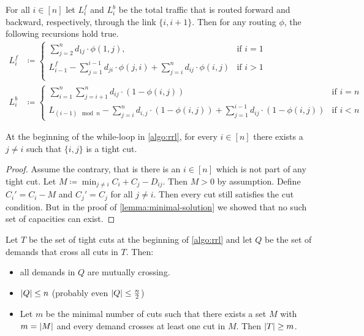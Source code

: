 \begin{lemma}
	For all $i \in [n]$ let $L_i^f$ and $L_i^b$ be the total traffic that is routed forward and backward, respectively, through the link $\{i, i+1\}$.
	Then for any routing $\phi$, the following recursions hold true.
	\begin{align}
		L_i^f &\coloneqq \begin{cases}
			\sum_{j = 2}^n d_{1j} \cdot \phi(1, j), & \text{if } i = 1 \\
			L_{i-1}^f - \sum_{j = 1}^{i-1} d_{ji} \cdot \phi(j, i) + \sum_{j = i}^{n} d_{ij} \cdot \phi(i, j) & \text{if } i > 1 \\
		\end{cases} \\
		L_i^b &\coloneqq \begin{cases}
		\sum_{i = 1}^n \sum_{j = i+1}^n d_{ij} \cdot (1 - \phi(i, j)) & \text{if } i = n\\
		L_{(i-1)\mod n} - \sum_{j = i}^{n} d_{i, j} \cdot (1 - \phi(i, j)) + \sum_{j = 1}^{i-1} d_{ij} \cdot(1 - \phi(i, j)) & \text{if } i < n
		\end{cases} \ 
	\end{align}
\end{lemma}

\begin{lemma}
	At the beginning of the while-loop in \cref{algo:rrl}, for every $i \in [n]$ there exists a $j \neq i$ such that $\{i, j\}$ is a tight cut.
\end{lemma}
\begin{proof}
	Assume the contrary, that is there is an $i \in [n]$ which is not part of any tight cut.
	Let $M \coloneqq \min_{j \neq i} C_i + C_j - D_{ij}$.
	Then $M > 0$ by assumption.
	Define $C_i' = C_i - M$ and $C_j' = C_j$ for all $j \neq i$.
	Then every cut still satisfies the cut condition.
	But in the proof of \cref{lemma:minimal-solution} we showed that no such set of capacities can exist.
\end{proof}

\begin{theorem}
	Let $T$ be the set of tight cuts at the beginning of \cref{algo:rrl} and let $Q$ be the set of demands that cross all cuts in $T$.
	Then:
	\begin{itemize}
		\item all demands in $Q$ are mutually crossing.
		\item $\abs{Q} \leq n$ (probably even $\abs{Q} \leq \frac{n}{2}$)
		\item Let $m$ be the minimal number of cuts such that there exists a set $M$ with $m = \abs{M}$ and every demand crosses at least one cut in $M$. Then $\abs{T} \geq m$.
	\end{itemize}
\end{theorem}

